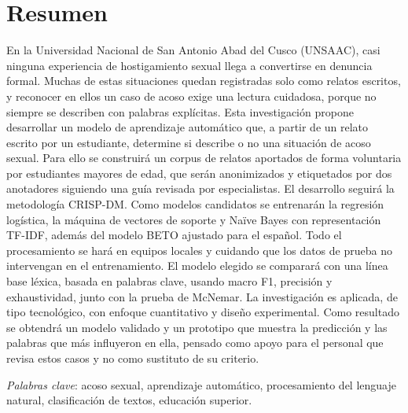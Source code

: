 \chapter*{Resumen}

\noindent En la Universidad Nacional de San Antonio Abad del Cusco (UNSAAC), casi ninguna experiencia de hostigamiento sexual llega a convertirse en denuncia formal. Muchas de estas situaciones quedan registradas solo como relatos escritos, y reconocer en ellos un caso de acoso exige una lectura cuidadosa, porque no siempre se describen con palabras explícitas. Esta investigación propone desarrollar un modelo de aprendizaje automático que, a partir de un relato escrito por un estudiante, determine si describe o no una situación de acoso sexual. Para ello se construirá un corpus de relatos aportados de forma voluntaria por estudiantes mayores de edad, que serán anonimizados y etiquetados por dos anotadores siguiendo una guía revisada por especialistas. El desarrollo seguirá la metodología CRISP-DM. Como modelos candidatos se entrenarán la regresión logística, la máquina de vectores de soporte y Naïve Bayes con representación TF-IDF, además del modelo BETO ajustado para el español. Todo el procesamiento se hará en equipos locales y cuidando que los datos de prueba no intervengan en el entrenamiento. El modelo elegido se comparará con una línea base léxica, basada en palabras clave, usando macro F1, precisión y exhaustividad, junto con la prueba de McNemar. La investigación es aplicada, de tipo tecnológico, con enfoque cuantitativo y diseño experimental. Como resultado se obtendrá un modelo validado y un prototipo que muestra la predicción y las palabras que más influyeron en ella, pensado como apoyo para el personal que revisa estos casos y no como sustituto de su criterio.

\vspace{0.5em}
\noindent\textit{Palabras clave}: acoso sexual, aprendizaje automático, procesamiento del lenguaje natural, clasificación de textos, educación superior.

